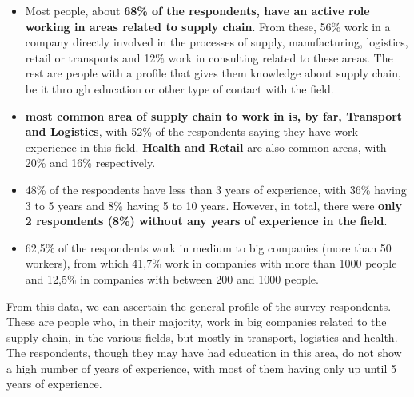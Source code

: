 \begin{itemize}
\item Most people, about \textbf{68\% of the respondents, have an active role working in areas related to supply chain}. From these, 56\% work in a company directly involved in the processes of supply, manufacturing, logistics, retail or transports and 12\% work in consulting related to these areas. The rest are people with a profile that gives them knowledge about supply chain, be it through education or other type of contact with the field.
\item \textbf{ most common area of supply chain to work in is, by far, Transport and Logistics}, with 52\% of the respondents saying they have work experience in this field. \textbf{Health and Retail} are also common areas, with 20\% and 16\% respectively.
\item 48\% of the respondents have less than 3 years of experience, with 36\% having 3 to 5 years and 8\% having 5 to 10 years. However, in total, there were \textbf{only 2 respondents (8\%) without any years of experience in the field}.
\item 62,5\% of the respondents work in medium to big companies (more than 50 workers), from which 41,7\% work in companies with more than 1000 people and 12,5\% in companies with between 200 and 1000 people.
\end{itemize}

From this data, we can ascertain the general profile of the survey respondents. These are people who, in their majority, work in big companies related to the supply chain, in the various fields, but mostly in transport, logistics and health. The respondents, though they may have had education in this area, do not show a high number of years of experience, with most of them having only up until 5 years of experience.